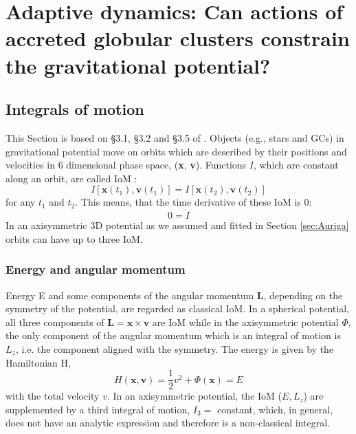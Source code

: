 \section[Adaptive dynamics]{Adaptive dynamics: Can actions of accreted globular clusters constrain the gravitational potential?}\label{sec:Dynamics}

\subsection{Integrals of motion}\label{subsec:IoMs}
This Section is based on \S3.1, \S3.2 and \S3.5 of \citet{Binney...Tremaine...2008}. Objects (e.g., stars and \acp{GC}) in gravitational potential move on orbits which are described by their positions and velocities in 6 dimensional phase space, (\textbf{x}, \textbf{v}). Functions $I$, which are constant along an orbit, are called \acf{IoM} \citep{Binney...Tremaine...2008}:
\begin{equation}
    I[\mathbf{x}(t_1), \mathbf{v}(t_1)] = I[\mathbf{x}(t_2), \mathbf{v}(t_2)]
\end{equation}
for any $t_1$ and $t_2$. This means, that the time derivative of these \ac{IoM} is 0:
\begin{equation}\label{eq:der_IoM}
    0 = \dot{I}
\end{equation}
In an axisymmetric 3D potential as we assumed and fitted in Section \ref{sec:Auriga} orbits can have up to three \ac{IoM}. 
\subsubsection{Energy and angular momentum}
Energy E and some components of the angular momentum \textbf{L}, depending on the symmetry of the potential, are regarded as classical \ac{IoM}. In a spherical potential, all three components of $\textbf{L} = \textbf{x} \times \textbf{v}$ are \ac{IoM} while in the axisymmetric potential $\Phi$, the only component of the angular momentum which is an integral of motion is $L_z$, i.e. the component aligned with the symmetry. The energy is given by the Hamiltonian H,
\begin{equation}\label{eq:energy_hamiltonian}
    H(\mathbf{x, v}) = \frac{1}{2}v^2 + \Phi(\mathbf{x}) = E
\end{equation}
with the total velocity $v$. In an axisymmetric potential, the \ac{IoM} ($E,L_z$) are supplemented by a third integral of motion, $I_3 =$ constant, which, in general, does not have an analytic expression and therefore is a non-classical integral. 

